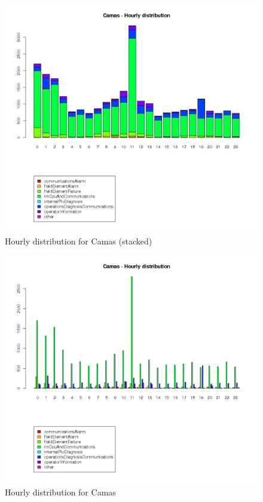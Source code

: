 \documentclass[a4paper,10pt]{book}
\begin{document}
\begin{figure}[h!]
 \centering
 \includegraphics[height=0.4\textheight]{./img/camas_timeline.png}
 \caption{Hourly distribution for Camas (stacked)}
\end{figure}
\begin{figure}[h!]
 \centering
 \includegraphics[height=0.4\textheight]{./img/camas_timeline_b.png}
 \caption{Hourly distribution for Camas}
\end{figure}
\end{document}

